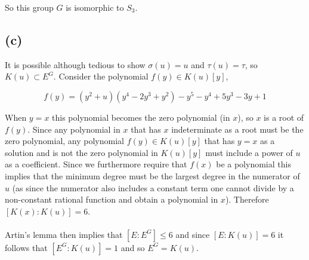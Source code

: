 \documentclass{article}
\begin{document}
So this group $G$ is isomorphic to $S_3$.

\subsection*{(c)}
It is possible although tedious to show $\sigma(u) = u$ and $\tau(u) = \tau$, so 
$K(u) \subset E^{G}$. Consider the polynomial $f(y) \in K(u)[y]$,

\begin{equation*}
    f(y) = (y^2+u)(y^4-2y^3+y^2)-y^5-y^4+5y^3-3y+1
\end{equation*}

When $y= x$ this polynomial becomes the zero polynomial (in $x$), so $x$ is a root of $f(y)$. 
Since any polynomial in $x$ that has $x$ indeterminate as a root must be the zero polynomial, 
any polynomial $f(y) \in K(u)[y]$ that has $y =x$ as a solution and is not the zero polynomial in 
$K(u)[y]$ must include a power of $u$ as a coefficient. Since we furthermore require that $f(x)$ 
be a polynomial this implies that the minimum degree must be the largest degree in the numerator of 
$u$ (as since the numerator also includes a constant term one cannot divide by a non-constant 
rational function and obtain a polynomial in $x$). Therefore $[K(x):K(u)] = 6$. 

\paragraph{}
Artin's lemma then implies that $[E:E^{G}] \leq 6$ and since $[E:K(u)] = 6$ it follows that 
$[E^G:K(u)] = 1$ and so $E^G = K(u)$.
\end{document}
